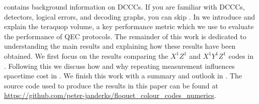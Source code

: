  contains background information on DCCCs.
If you are familiar with DCCCs, detectors, logical errors, and decoding graphs, you can skip .
In  we introduce and explain the teraquop volume, a key performance metric which we use to evaluate the performance of QEC protocols.
The remainder of this work
is dedicated to understanding the main results and explaining how these results have
been obtained.
We first focus on the results comparing the $X^1 Z^1$ and $X^1 Y^1 Z^1$ codes in .
Following this we discuss how and why repeating measurement influences spacetime cost in .
We finish this work with a summary and outlook in .
The source code used to produce the results in this paper can be found at \\
\url{https://github.com/peter-janderks/floquet_colour_codes_numerics}.

